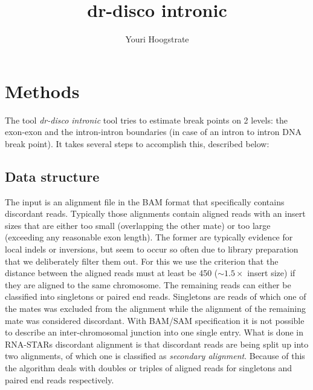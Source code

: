 \documentclass{article}
\title{dr-disco intronic}
\author[1]{Youri Hoogstrate}
\affil[1]{Department of Urology, Erasmus University Medical Center}
\theoremstyle{definition}
\begin{document}
\maketitle



\twocolumn

\section{Methods}
The tool \textit{dr-disco intronic} tool tries to estimate break points on 2 levels: the exon-exon and the intron-intron boundaries (in case of an intron to intron DNA break point). It takes several steps to accomplish this, described below:

\subsection{Data structure}
The input is an alignment file in the BAM format that specifically contains discordant reads.
Typically those alignments contain aligned reads with an insert sizes that are either too small (overlapping the other mate) or too large (exceeding any reasonable exon length).
The former are typically evidence for local indels or inversions, but seem to occur so often due to library preparation that we deliberately filter them out.
For this we use the criterion that the distance between the aligned reads must at least be 450 ($\sim1.5 \times$ insert size) if they are aligned to the same chromosome.
The remaining reads can either be classified into singletons or paired end reads.
Singletons are reads of which one of the mates was excluded from the alignment while the alignment of the remaining mate was considered discordant.
With BAM/SAM specification it is not possible to describe an inter-chromosomal junction into one single entry.
What is done in RNA-STARs discordant alignment is that discordant reads are being split up into two alignments, of which one is classified as \textit{secondary alignment}.
Because of this the algorithm deals with doubles or triples of aligned reads for singletons and paired end reads respectively.
\end{document}
